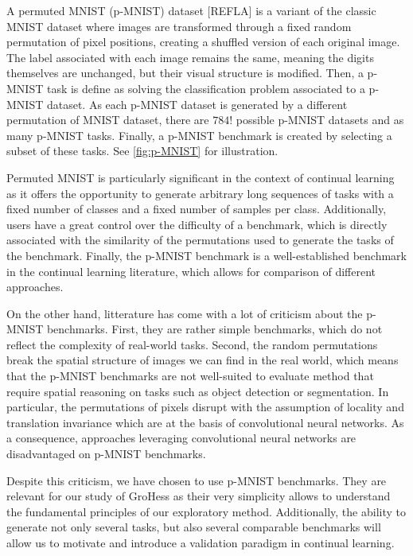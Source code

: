 \documentclass[twocolumn]{article}
\begin{document}
A permuted MNIST (p-MNIST) dataset [REFLA] is a variant of the classic MNIST dataset where images are transformed through a fixed random permutation of pixel positions, creating a shuffled version of each original image. The label associated with each image remains the same, meaning the digits themselves are unchanged, but their visual structure is modified. Then, a p-MNIST task is define as solving the classification problem associated to a p-MNIST dataset. As each p-MNIST dataset is generated by a different permutation of MNIST dataset, there are $784!$ possible p-MNIST datasets and as many p-MNIST tasks. Finally, a p-MNIST benchmark is created by selecting a subset of these tasks. See \ref{fig:p-MNIST} for illustration.

\vspace{2mm}
\noindent
Permuted MNIST is particularly significant in the context of continual learning as it offers the opportunity to generate arbitrary long sequences of tasks with a fixed number of classes and a fixed number of samples per class. Additionally, users have a great control over the difficulty of a benchmark, which is directly associated with the similarity of the permutations used to generate the tasks of the benchmark. Finally, the p-MNIST benchmark is a well-established benchmark in the continual learning literature, which allows for comparison of different approaches.

\vspace{2mm}
\noindent
On the other hand, litterature has come with a lot of criticism about the p-MNIST benchmarks. First, they are rather simple benchmarks, which do not reflect the complexity of real-world tasks. Second, the random permutations break the spatial structure of images we can find in the real world, which means that the p-MNIST benchmarks are not well-suited to evaluate method that require spatial reasoning on tasks such as object detection or segmentation. In particular, the permutations of pixels disrupt with the assumption of locality and translation invariance which are at the basis of convolutional neural networks. As a consequence, approaches leveraging convolutional neural networks are disadvantaged on p-MNIST benchmarks.

\vspace{2mm}
\noindent
Despite this criticism, we have chosen to use p-MNIST benchmarks. They are relevant for our study of GroHess as their very simplicity allows to understand the fundamental principles of our exploratory method. Additionally, the ability to generate not only several tasks, but also several comparable benchmarks will allow us to motivate and introduce a validation paradigm in continual learning.
\end{document}
